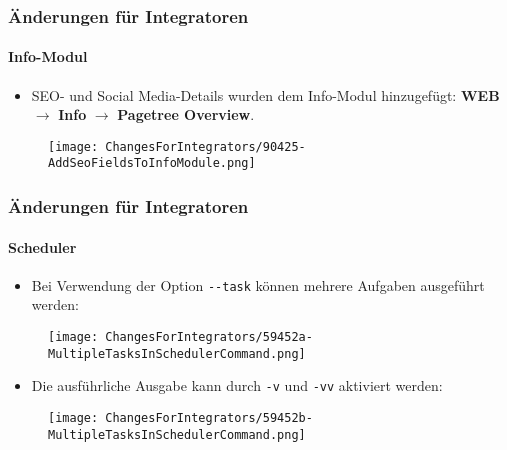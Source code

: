 
\begin{frame}[fragile]
	\frametitle{Änderungen für Integratoren}
	\framesubtitle{Info-Modul}

	\begin{itemize}
		\item SEO- und Social Media-Details wurden dem Info-Modul hinzugefügt:\newline
			\textbf{WEB} $\rightarrow$ \textbf{Info} $\rightarrow$ \textbf{Pagetree Overview}.
	\end{itemize}

	\begin{figure}
		\texttt{[image: ChangesForIntegrators/90425-AddSeoFieldsToInfoModule.png]}
	\end{figure}

\end{frame}


\begin{frame}[fragile]
	\frametitle{Änderungen für Integratoren}
	\framesubtitle{Scheduler}

	\lstset{basicstyle=\tiny\ttfamily}

	\begin{itemize}
		\item Bei Verwendung der Option \texttt{-}\texttt{-}\texttt{task} können mehrere Aufgaben ausgeführt werden:
	\end{itemize}

	\begin{figure}
		\texttt{[image: ChangesForIntegrators/59452a-MultipleTasksInSchedulerCommand.png]}
	\end{figure}

	\begin{itemize}
		\item Die ausführliche Ausgabe kann durch \texttt{-}\texttt{v} und \texttt{-}\texttt{vv} aktiviert werden:
	\end{itemize}

	\begin{figure}
		\texttt{[image: ChangesForIntegrators/59452b-MultipleTasksInSchedulerCommand.png]}
	\end{figure}

\end{frame}

